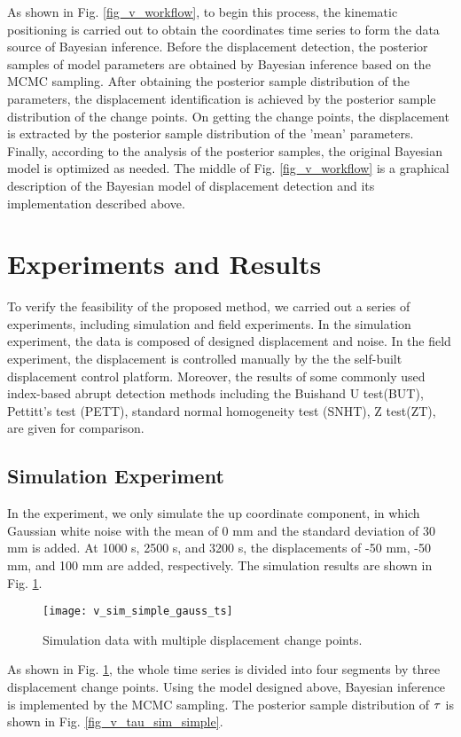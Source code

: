 \documentclass[final,3p,times]{elsarticle}
\begin{document}
	As shown in Fig. \ref{fig_v_workflow}, to begin this process, the kinematic positioning is carried out to obtain the coordinates time series to form the data source of Bayesian inference. 
	Before the displacement detection,  the posterior samples of model parameters are obtained by Bayesian inference based on the MCMC sampling.
	After obtaining the posterior sample distribution of the parameters, the displacement identification is achieved by the posterior sample distribution of the change points.
	On getting the change points, the displacement is extracted by the posterior sample distribution of  the 'mean' parameters.
	Finally, according to the analysis of the posterior samples, the original Bayesian model is optimized as needed.
	The middle of Fig. \ref{fig_v_workflow} is a graphical description of the Bayesian model of displacement detection and its implementation described above.
	
	\section{Experiments and Results}
	\label{exp}
	To verify the feasibility of the proposed method, we carried out a series of experiments, including simulation and field experiments. 
	In the simulation experiment, the data is composed of designed displacement and noise.
	In the field experiment, the displacement is controlled manually by the  the self-built displacement control platform.
	Moreover, the results of some commonly used index-based abrupt detection methods including the Buishand U test(BUT), Pettitt’s test (PETT), standard normal homogeneity test (SNHT), Z test(ZT), are given for comparison.
	
	\subsection{Simulation Experiment}
	In the experiment, we only simulate the up coordinate component, in which Gaussian white noise with the mean of 0 mm and the standard deviation of 30 mm is added.
	At 1000 s, 2500 s, and 3200 s, the displacements of -50 mm, -50 mm, and 100 mm are added, respectively. 
	The simulation results are shown in Fig. \ref{fig_v_sim_simple_gauss_ts}.
	
	\begin{figure}[htbp]
		\centering
		\texttt{[image: v\_sim\_simple\_gauss\_ts]}
		\caption{Simulation data with multiple displacement change points.}
		\label{fig_v_sim_simple_gauss_ts}
	\end{figure} 
	As shown in Fig. \ref{fig_v_sim_simple_gauss_ts}, the whole time series is divided into four segments by three displacement change points. 
	Using the model designed above, Bayesian inference is implemented by the MCMC sampling. 
	The posterior sample distribution of $\bf{\tau}$ is shown in Fig. \ref{fig_v_tau_sim_simple}.
	
\end{document}
